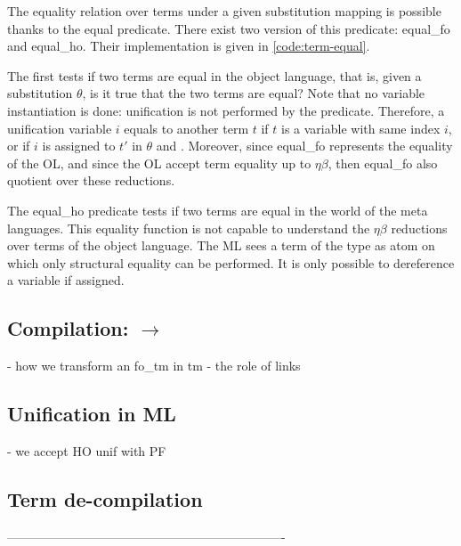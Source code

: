 \documentclass[sigconf,natbib=false]{acmart}
\begin{document}
\def\eqfo{equal\_fo\xspace}
\def\eqho{equal\_ho\xspace}
\def\etabeta{$\eta\beta$\xspace}

The equality relation over terms under a given substitution mapping is possible 
thanks to the equal predicate. There exist
two version of this predicate: \eqfo and \eqho. Their implementation is given in
\cref{code:term-equal}. 

The first tests if two terms are equal in the object language, that is, given a
substitution $\theta$, is it true that the two terms are equal? Note that no
variable instantiation is done: unification is not performed by the
 predicate. Therefore, a unification variable $i$ equals to
another term $t$ if $t$ is a variable with same index $i$, or if $i$ is assigned
to $t'$ in $\theta$ and . Moreover, since \eqfo 
represents the equality of the OL, and since the OL accept term equality up to
\etabeta, then \eqfo also quotient over these reductions.

The \eqho predicate tests if two terms are equal in the world of the meta
languages. This equality function is not capable to understand the \etabeta
reductions over terms of the object language. The ML sees a term of the type
 as atom on which only structural equality can be performed. It is
only possible to dereference a variable if assigned.

\subsection[Compilation: fo\_tm to tm]{Compilation:  $\to$ }

- how we transform an fo\_tm in tm
- the role of links

\subsection{Unification in ML}

- we accept HO unif with PF

\subsection{Term de-compilation}





-------------------------------------------------------------------
\end{document}
